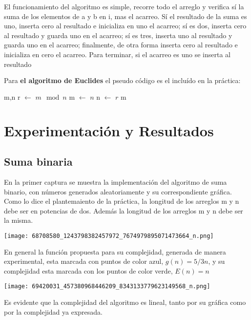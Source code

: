 \documentclass[12pt,twoside]{article}
\begin{document}
El funcionamiento del algoritmo es simple, recorre todo el arreglo y verifica s\'i la suma de los elementos de a y b en i, mas el acarreo. S\'i el resultado de la suma es uno, inserta cero al resultado e inicializa en uno el acarreo; s\'i es dos, inserta cero al resultado y guarda uno en el acarreo; s\'i es tres, inserta uno al resultado y guarda uno en el acarreo; finalmente, de otra forma inserta cero al resultado e inicializa en cero el acarreo. Para terminar, si el acarreo es uno se inserta al resultado

Para \textbf{el algoritmo de Euclides} el pseudo código es el inclu\'ido en la pr\'actica:
\begin{algorithmic}
    \Require m,n
        \State r $\longleftarrow$ $m\mod n$
        \State m $\longleftarrow$ $n$
        \State n $\longleftarrow$ $r$
    \EndWhile
    \State \Return m
\end{algorithmic}
 
\section{Experimentaci\'on y Resultados}
\subsection{Suma binaria}
En la primer captura se muestra la implementaci\'on del algoritmo de suma binario, con n\'umeros generados aleatoriamente y su correspondiente gr\'afica. Como lo dice el plantemaiento de la pr\'actica, la longitud de los arreglos m y n debe ser en potencias de dos. Adem\'as la longitud de los arreglos m y n debe ser la misma.
\begin{center}
    \texttt{[image: 68708580\_1243798382457972\_7674979895071473664\_n.png]}
\end{center}
En general la funci\'on propuesta para su complejidad, generada de manera experimental, esta marcada con puntos de color azul, $g(n) = 5/3 n$, y su complejidad esta marcada con los puntos de color verde, $E(n) = n$
\begin{center}
    \texttt{[image: 69420031\_457380968446209\_8343133779623149568\_n.png]}
\end{center}
Es evidente que la complejidad del algoritmo es lineal, tanto por su gr\'afica como por la complejidad ya expresada.
\end{document}
